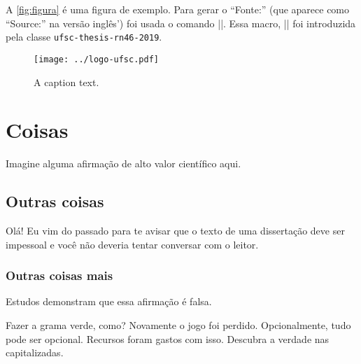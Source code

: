 \documentclass[english,embeddedlogo]{../ufsc-thesis-rn46-2019/ufsc-thesis-rn46-2019}
\begin{document}
A \autoref{fig:figura} é uma figura de exemplo. Para gerar o ``Fonte:'' (que aparece como ``Source:'' na versão inglês') foi usada o comando \mt||. Essa macro, \mt|\captionsource| foi introduzida pela classe \texttt{ufsc-thesis-rn46-2019}.

\begin{figure}[t]
  \centering
  \caption{\footnotesize A caption text.}
  \label{fig:figura}

  \texttt{[image: ../logo-ufsc.pdf]}
\end{figure}

\section{Coisas}
\label{sec:stuff}
Imagine alguma afirmação de alto valor científico aqui.

\subsection{Outras coisas}
\label{sec:more}
Olá! Eu vim do passado para te avisar que o texto de uma dissertação deve ser impessoal e você não deveria tentar conversar com o leitor. 

\subsubsection{Outras coisas mais}
\label{sec:yet-more}
Estudos demonstram que essa afirmação é falsa.

\label{sec:yet-another}
Fazer a grama verde, como? Novamente o jogo foi perdido. Opcionalmente, tudo pode ser opcional. Recursos foram gastos com isso. Descubra a verdade nas capitalizadas.


\postextual

\end{document}
